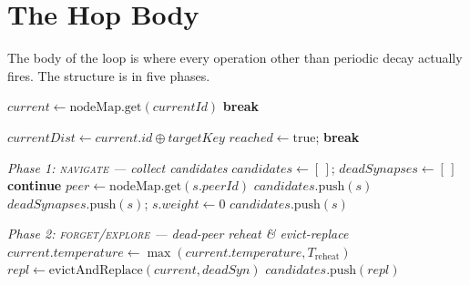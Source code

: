 \documentclass[twoside,nobib]{tufte-book}
\begin{document}
\section{The Hop Body}

The body of the loop is where every operation other than periodic
decay actually fires. The structure is in five
phases.

\begin{algorithm}
\caption{hop body, run for each hop $\in [0, \texttt{maxHops})$}
\begin{algorithmic}[1]
\State $\mathit{current} \gets \mathrm{nodeMap.get}(\mathit{currentId})$
 \textbf{break}
\EndIf

\State $\mathit{currentDist} \gets \mathit{current}.\mathit{id} \oplus \mathit{targetKey}$
  $\mathit{reached} \gets \mathrm{true}$; \textbf{break}
\EndIf

\Statex \emph{Phase 1: \textsc{navigate} --- collect candidates}
\State $\mathit{candidates} \gets [\,]$;
       $\mathit{deadSynapses} \gets [\,]$
    \textbf{continue} 
  \EndIf
  \State $\mathit{peer} \gets \mathrm{nodeMap.get}(s.\mathit{peerId})$
    $\mathit{candidates}.\mathrm{push}(s)$
  \Else
    $\mathit{deadSynapses}.\mathrm{push}(s)$;
    $s.\mathit{weight} \gets 0$
  \EndIf
\EndFor
{}
    $\mathit{candidates}.\mathrm{push}(s)$
  \EndIf
\EndFor

\Statex \emph{Phase 2: \textsc{forget}/\textsc{explore} ---
        dead-peer reheat \& evict-replace}
  \State $\mathit{current}.\mathit{temperature} \gets
         \max(\mathit{current}.\mathit{temperature}, T_{\mathrm{reheat}})$
    \State $\mathit{repl} \gets \mathrm{evictAndReplace}(\mathit{current},
           \mathit{deadSyn})$
      \State $\mathit{candidates}.\mathrm{push}(\mathit{repl})$
    \EndIf
  \EndFor
\EndIf


\end{algorithmic}
\end{algorithm}
\end{document}
